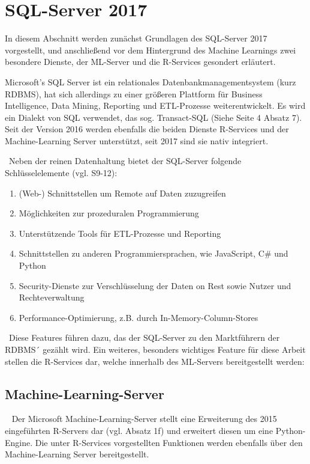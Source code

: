 \section{SQL-Server 2017}
\label{sec:SQLServer}
In diesem Abschnitt werden zunächst Grundlagen des SQL-Server 2017 vorgestellt, und anschließend vor dem Hintergrund des Machine Learnings zwei besondere Dienste, der ML-Server und die R-Services gesondert erläutert. 

Microsoft’s SQL Server ist ein relationales Datenbankmanagementsystem (kurz RDBMS), hat sich allerdings zu einer größeren Plattform für Business Intelligence, Data Mining, Reporting und ETL-Prozesse weiterentwickelt. Es wird ein Dialekt von SQL verwendet, das sog. Transact-SQL (Siehe \cite{SQLData} Seite 4 Absatz 7). Seit der Version 2016 werden ebenfalls die beiden Dienste R-Services und der Machine-Learning Server unterstützt, seit 2017 sind sie nativ integriert. 

~\newline Neben der reinen Datenhaltung bietet der SQL-Server folgende Schlüsselelemente (vgl. \cite{SQLServerWP} S9-12):
\begin{enumerate}
	\item (Web-) Schnittstellen um Remote auf Daten zuzugreifen
	\item Möglichkeiten zur prozeduralen Programmierung
	\item Unterstützende Tools für ETL-Prozesse und Reporting
	\item Schnittstellen zu anderen Programmiersprachen, wie JavaScript, C\# und Python
	\item Security-Dienste zur Verschlüsselung der Daten on Rest sowie Nutzer und Rechteverwaltung
	\item Performance-Optimierung, z.B. durch In-Memory-Column-Stores
\end{enumerate}

~\newline Diese Features führen dazu, das der SQL-Server zu den Marktführern der RDBMS´ gezählt wird. Ein weiteres, besonders wichtiges Feature für diese Arbeit stellen die R-Services dar, welche innerhalb des ML-Servers bereitgestellt werden:

\subsection{Machine-Learning-Server} ~\newline
Der Microsoft Machine-Learning-Server stellt eine Erweiterung des 2015 eingeführten R-Servers dar (vgl. \cite{MLServerInfo} Absatz 1f) und erweitert diesen um eine Python-Engine. Die unter R-Services vorgestellten Funktionen werden ebenfalls über den Machine-Learning Server bereitgestellt. 

